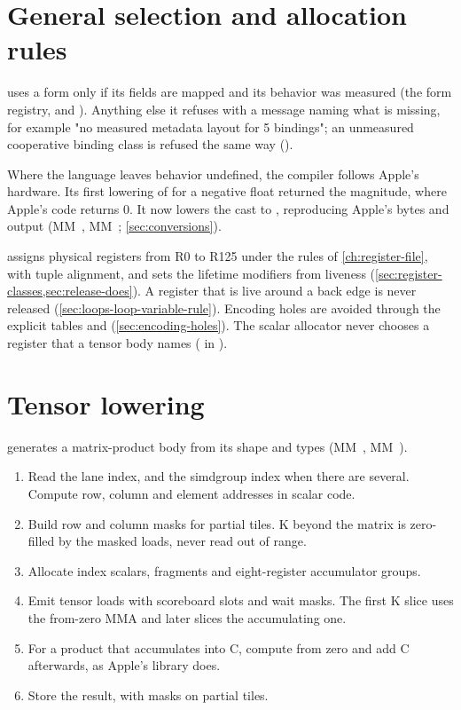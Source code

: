 

\section{General selection and allocation rules}\label{ch:selection-allocation-general}

 uses a form only if its fields are mapped and its behavior
was measured (the form registry,  and ). Anything else it refuses with a message
naming what is missing, for example "no measured metadata layout for 5 bindings"; an unmeasured cooperative binding
class is refused the same way ().

Where the language leaves behavior undefined, the compiler follows Apple's hardware. Its first lowering of
 for a negative float returned the magnitude, where Apple's code returns 0. It now lowers the cast to , reproducing Apple's bytes and output (MM~, MM~; \cref{sec:conversions}).

 assigns physical registers from R0 to R125 under the rules of \cref{ch:register-file}, with tuple
alignment, and sets the lifetime modifiers from liveness (\cref{sec:register-classes,sec:release-does}). A register that is live
around a back edge is never released (\cref{sec:loops-loop-variable-rule}). Encoding holes are avoided through the
explicit tables  and  (\cref{sec:encoding-holes}). The
scalar allocator never chooses a register that a tensor body names ( in
).

\section{Tensor lowering}\label{ch:tensor-lowering}

 generates a matrix-product body from its shape and types (MM~, MM~).

\begin{enumerate}
\def\labelenumi{\arabic{enumi}.}
\item Read the lane index, and the simdgroup index when there are several. Compute row, column and element addresses
  in scalar code.
\item Build row and column masks for partial tiles. K beyond the matrix is zero-filled by the masked loads, never read
  out of range.
\item Allocate index scalars, fragments and eight-register accumulator groups.
\item Emit tensor loads with scoreboard slots and wait masks. The first K slice uses the from-zero MMA and later slices
  the accumulating one.
\item For a product that accumulates into C, compute from zero and add C afterwards, as Apple's library does.
\item Store the result, with masks on partial tiles.
\end{enumerate}

